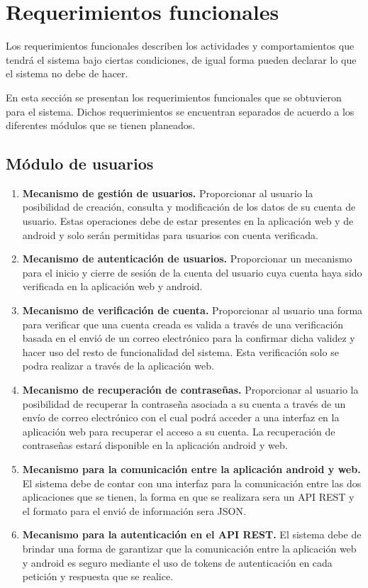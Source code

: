 \section{Requerimientos funcionales}
    Los requerimientos funcionales describen los actividades y comportamientos que tendrá el sistema bajo ciertas condiciones, de igual forma pueden declarar lo que el sistema no debe de hacer.
    
    En esta sección se presentan los requerimientos funcionales que se obtuvieron para el sistema. Dichos requerimientos se encuentran separados de acuerdo a los diferentes módulos que se tienen planeados.
    \subsection{Módulo de usuarios}
    \begin{enumerate}[label=\textbf{RF\arabic*.}]
    \item \textbf{Mecanismo de gestión de usuarios.} Proporcionar al usuario la posibilidad de creación, consulta y modificación de los datos de su cuenta de usuario. Estas operaciones debe de estar presentes en la aplicación web y de android y solo serán permitidas para usuarios con cuenta verificada.
    \item \textbf{Mecanismo de autenticación de usuarios.} Proporcionar un mecanismo para el inicio y cierre de sesión de la cuenta del usuario cuya cuenta haya sido verificada en la aplicación web y android.
    \item \textbf{Mecanismo de verificación de cuenta.} Proporcionar al usuario una forma para verificar que una cuenta creada es valida a través de una verificación basada en el envió de un correo electrónico para la confirmar dicha validez y hacer uso del resto de funcionalidad del sistema. Esta verificación solo se podra realizar a través de la aplicación web.
    \item \textbf{Mecanismo de recuperación de contraseñas.} Proporcionar al usuario la posibilidad de recuperar la contraseña asociada a su cuenta a través de un envío de correo electrónico con el cual podrá acceder a una interfaz en la aplicación web para recuperar el acceso a su cuenta. La recuperación de contraseñas estará disponible en la aplicación android y web.
    \item \textbf{Mecanismo para la comunicación entre la aplicación android y web.} El sistema debe de contar con una interfaz para la comunicación entre las dos aplicaciones que se tienen, la forma en que se realizara sera un API REST y el formato para el envió de información sera JSON.
    \item \textbf{Mecanismo para la autenticación en el API REST.} El sistema debe de brindar una forma de garantizar que la comunicación entre la aplicación web y android es seguro mediante el uso de tokens de autenticación en cada petición y respuesta que se realice.
    \end{enumerate}
    
